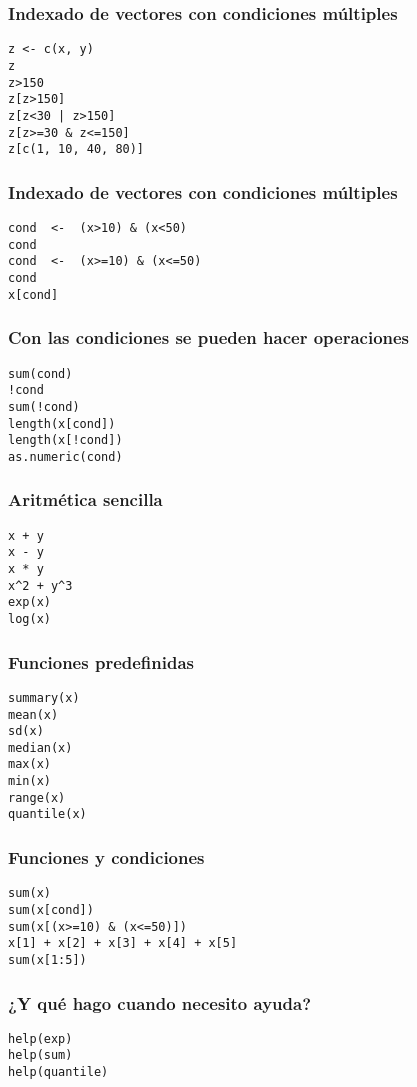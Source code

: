 \documentclass{beamer}
\begin{document}
\begin{frame}[fragile]
\frametitle{Indexado de vectores con condiciones múltiples}
\label{sec-1-1-11}



\lstset{language=R}
\begin{lstlisting}
z <- c(x, y)
z
z>150
z[z>150]
z[z<30 | z>150]
z[z>=30 & z<=150]
z[c(1, 10, 40, 80)]
\end{lstlisting}
\end{frame}
\begin{frame}[fragile]
\frametitle{Indexado de vectores con condiciones múltiples}
\label{sec-1-1-12}


\lstset{language=R}
\begin{lstlisting}
cond  <-  (x>10) & (x<50)
cond
cond  <-  (x>=10) & (x<=50)
cond
x[cond]
\end{lstlisting}
\end{frame}
\begin{frame}[fragile]
\frametitle{Con las condiciones se pueden hacer operaciones}
\label{sec-1-1-13}


\lstset{language=R}
\begin{lstlisting}
sum(cond)
!cond
sum(!cond)
length(x[cond])
length(x[!cond])
as.numeric(cond)
\end{lstlisting}
    
\end{frame}
\begin{frame}[fragile]
\frametitle{Aritmética sencilla}
\label{sec-1-1-14}


\lstset{language=R}
\begin{lstlisting}
x + y
x - y
x * y
x^2 + y^3
exp(x)
log(x)
\end{lstlisting}
\end{frame}
\begin{frame}[fragile]
\frametitle{Funciones predefinidas}
\label{sec-1-1-15}


\lstset{language=R}
\begin{lstlisting}
summary(x)
mean(x)
sd(x)
median(x)
max(x)
min(x)
range(x)
quantile(x)
\end{lstlisting}
\end{frame}
\begin{frame}[fragile]
\frametitle{Funciones y condiciones}
\label{sec-1-1-16}


\lstset{language=R}
\begin{lstlisting}
sum(x)
sum(x[cond])
sum(x[(x>=10) & (x<=50)])
x[1] + x[2] + x[3] + x[4] + x[5]
sum(x[1:5])
\end{lstlisting}
\end{frame}
\begin{frame}[fragile]
\frametitle{¿Y qué hago cuando necesito ayuda?}
\label{sec-1-1-17}



\lstset{language=R}
\begin{lstlisting}
help(exp)
help(sum)
help(quantile)
\end{lstlisting}
\end{frame}
\end{document}
